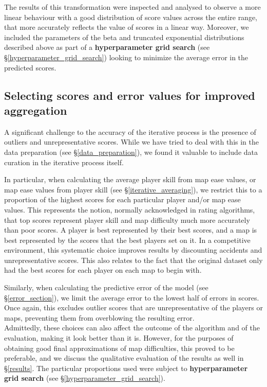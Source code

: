 \documentclass[12pt,a4paper]{article}
\begin{document}
The results of this transformation were inspected and analysed to observe a more linear behaviour with a good distribution of score values across the entire range, that more accurately reflects the value of scores in a linear way. Moreover, we included the parameters of the beta and truncated exponential distributions described above as part of a {\bf{hyperparameter grid search}} (see \S \ref{hyperparameter_grid_search}) looking to minimize the average error in the predicted scores.\\

\subsection{Selecting scores and error values for improved aggregation}
\label{selecting_aggregation}

A significant challenge to the accuracy of the iterative process is the presence of outliers and unrepresentative scores. While we have tried to deal with this in the data preparation (see \S \ref{data_preparation}), we found it valuable to include data curation in the iterative process itself.

In particular, when calculating the average player skill from map ease values, or map ease values from player skill (see \S \ref{iterative_averaging}), we restrict this to a proportion of the highest scores for each particular player and/or map ease values. This represents the notion, normally acknowledged in rating algorithms, that top scores represent player skill and map difficulty much more accurately than poor scores. A player is best represented by their best scores, and a map is best represented by the scores that the best players set on it. In a competitive environment, this systematic choice improves results by discounting accidents and unrepresentative scores. This also relates to the fact that the original dataset only had the best scores for each player on each map to begin with.

Similarly, when calculating the predictive error of the model (see \S \ref{error_section}), we limit the average error to the lowest half of errors in scores. Once again, this excludes outlier scores that are unrepresentative of the players or maps, preventing them from overblowing the resulting error.\\

Admittedly, these choices can also affect the outcome of the algorithm and of the evaluation, making it look better than it is. However, for the purposes of obtaining good final approximations of map difficulties, this proved to be preferable, and we discuss the qualitative evaluation of the results as well in \S \ref{results}. The particular proportions used were subject to {\bf{hyperparameter grid search}} (see \S \ref{hyperparameter_grid_search}).
\end{document}
